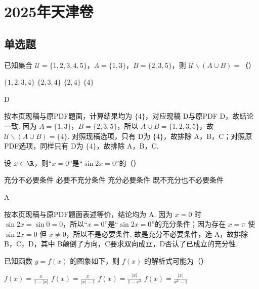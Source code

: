 \chapter{2025年天津卷}

\section{单选题}

\begin{problem}
已知集合 \(\mathcal U=\{1,2,3,4,5\}\)，\(A=\{1,3\}\)，\(B=\{2,3,5\}\)，则 \(\mathcal U\smallsetminus(A\cup B)=\)（\quad）

\choices
    {\(\{1,2,3,4\}\)}
    {\(\{2,3,4\}\)}
    {\(\{2,4\}\)}
    {\(\{4\}\)}
\end{problem}

\begin{answer}
D
\end{answer}

\begin{solution}
按本页现稿与原PDF题面，计算结果均为 \(\{4\}\)，对应现稿 D与原PDF D，故结论一致. 因为 \(A=\{1,3\}\)，\(B=\{2,3,5\}\)，所以 \(A\cup B=\{1,2,3,5\}\)，故 \(\mathcal U\smallsetminus\left( A\cup B \right)=\{4\}\). 对照现稿选项，只有 D为 \(\{4\}\)，故排除 A，B，C；对照原PDF选项，同样只有 D为 \(\{4\}\)，故排除 A，B，C.
\end{solution}

\begin{problem}
设 \(x\in\R\)，则“\(x=0\)”是“\(\sin 2x=0\)”的（\quad）

\choices
    {充分不必要条件}
    {必要不充分条件}
    {充分必要条件}
    {既不充分也不必要条件}
\end{problem}

\begin{answer}
A
\end{answer}

\begin{solution}
按本页现稿与原PDF题面表述等价，结论均为 A. 因为 \(x=0\) 时 \(\sin 2x=\sin 0=0\)，所以“\(x=0\)”是“\(\sin 2x=0\)”的充分条件；因为存在 \(x=\pi\) 使 \(\sin 2x=0\) 但 \(x\ne 0\)，所以不是必要条件. 故是充分不必要条件，选 A，故排除 B，C，D，其中 B颠倒了方向，C要求双向成立，D否认了已成立的充分性.
\end{solution}

\begin{problem}
已知函数 \(y=f(x)\) 的图象如下，则 \(f(x)\) 的解析式可能为（\quad）


\choices
    {\(f(x)=\frac{x}{1-|x|}\)}
    {\(f(x)=\frac{x}{|x|-1}\)}
    {\(f(x)=\frac{|x|}{1-x^2}\)}
    {\(f(x)=\frac{|x|}{x^2-1}\)}
\end{problem}

